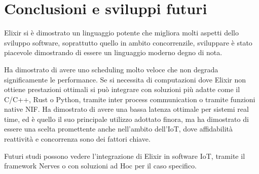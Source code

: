 \chapter*{Conclusioni e sviluppi futuri}

\setlength{\parindent}{0pt}

Elixir si è dimostrato un linguaggio potente che
migliora molti aspetti dello sviluppo software,
soprattutto quello in ambito concorrenzile, sviluppare
è stato piacevole dimostrando di essere un linguaggio
moderno degno di nota.
\vspace{1.5em}

Ha dimostrato di avere uno scheduling molto
veloce che non degrada significamente le performance.
Se si necessita di computazioni dove Elixir non
ottiene prestazioni ottimali 
si può integrare con 
soluzioni più adatte come il C/C++, Rust o Python, tramite
inter process communication o tramite funzioni native NIF.
Ha dimostrato di avere una bassa latenza ottimale per
sistemi real time, ed è quello il suo principale utilizzo
adottato finora, ma ha dimostrato di essere una scelta promettente
anche nell'ambito dell'IoT, dove affidabilità reattività 
e concorrenza sono dei fattori chiave.
\vspace{1.5em}

Futuri studi possono vedere l'integrazione di Elixir
in software IoT, tramite il framework Nerves o con
soluzioni ad Hoc per il caso specifico.